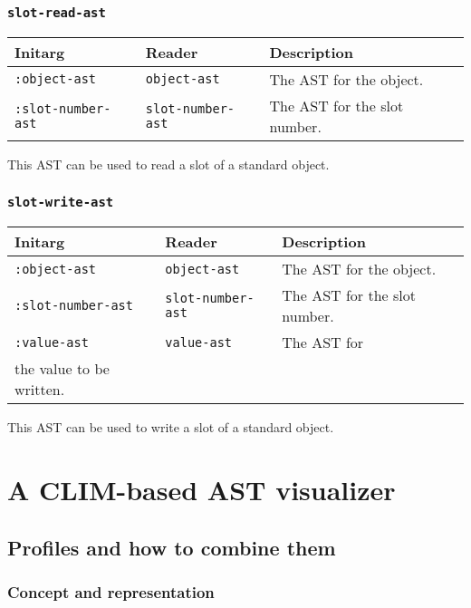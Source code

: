 \subsubsection{\texttt{slot-read-ast}}
\label{sec-ast-slot-read}

\begin{tabular}{|l|l|l|}
  \hline
  Initarg & Reader & Description\\
  \hline\hline
  \texttt{:object-ast} & \texttt{object-ast} & The AST for the object.\\
  \texttt{:slot-number-ast} & \texttt{slot-number-ast} & The AST for
  the slot number.\\
  \hline
\end{tabular}

This AST can be used to read a slot of a standard object.

\subsubsection{\texttt{slot-write-ast}}
\label{sec-ast-slot-write}

\begin{tabular}{|l|l|l|}
  \hline
  Initarg & Reader & Description\\
  \hline\hline
  \texttt{:object-ast} & \texttt{object-ast} & The AST for the object.\\
  \texttt{:slot-number-ast} & \texttt{slot-number-ast} & The AST for
  the slot number.\\
  \texttt{:value-ast} & \texttt{value-ast} & The AST for\\
  the value to be written.\\
  \hline
\end{tabular}

This AST can be used to write a slot of a standard object.

\section{A CLIM-based AST visualizer}

\subsection{Profiles and how to combine them}

\subsubsection{Concept and representation}

